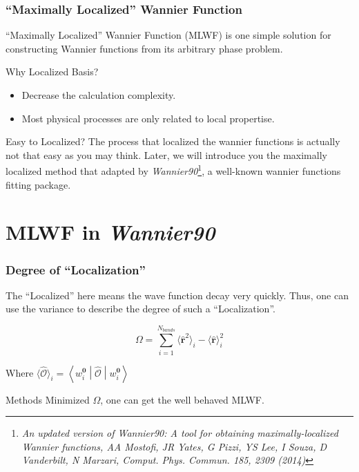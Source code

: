 \documentclass{beamer}
\begin{document}
  \begin{frame}
    \frametitle{``Maximally Localized'' Wannier Function}

    ``Maximally Localized'' Wannier Function (MLWF) is one simple solution for constructing Wannier functions from its arbitrary phase problem.
    
    \begin{block}{Why Localized Basis?}
      \begin{itemize}
        \item Decrease the calculation complexity. 
        \item Most physical processes are only related to local propertise.
      \end{itemize}
    \end{block}

    \begin{block}{Easy to Localized?}
      The process that localized the wannier functions is actually not that easy as you may think. Later, we will introduce you the maximally localized method that adapted by \emph{Wannier90}\footnote{\tiny\emph{An updated version of \emph{Wannier90}: A tool for obtaining maximally-localized Wannier functions, AA Mostofi, JR Yates, G Pizzi, YS Lee, I Souza, D Vanderbilt, N Marzari, Comput. Phys. Commun. 185, 2309 (2014) }}, a well-known wannier functions fitting package.
    \end{block}

  \end{frame}

  \section{MLWF in \emph{Wannier90}}

  \begin{frame}
    \frametitle{Degree of ``Localization''}
    
    The ``Localized'' here means the wave function decay very quickly. Thus, one can use the variance to describe the degree of such a ``Localization''.

    \begin{equation}
        \Omega = \sum_{i=1}^{N_{bands}}\langle\widehat{\mathbf{r}}^2\rangle_i-\langle\widehat{\mathbf{r}}\rangle_i^2
    \end{equation}
    
    Where \(\langle\widehat{\mathcal{O}}\rangle_i = \left\langle{}w_i^\mathbf{0}\middle|\widehat{\mathcal{O}}\middle|w_i^\mathbf{0}\right\rangle\)
    \begin{block}{Methods}
      Minimized \(\Omega\), one can get the well behaved MLWF. 
    \end{block}
    
  \end{frame}
\end{document}
